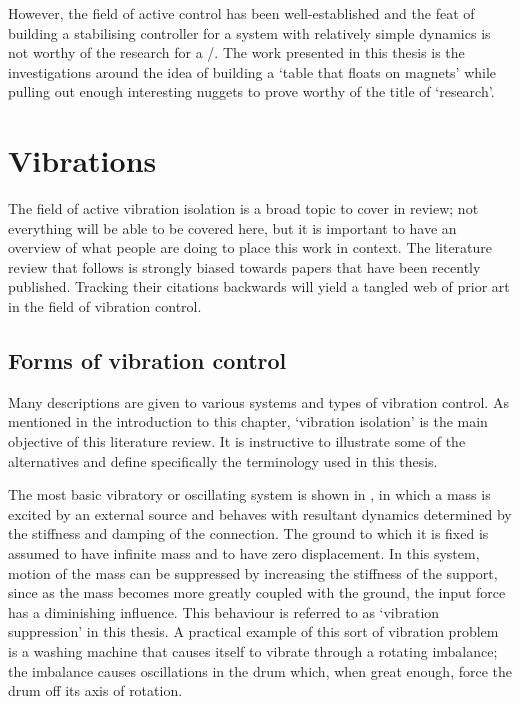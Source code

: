However, the field of active control has been well-established and the feat of building a stabilising controller for a system with relatively simple dynamics is not worthy of the research for a \PhD/.
The work presented in this thesis is the investigations around the idea of building a `table that floats on magnets' while pulling out enough interesting nuggets to prove worthy of the title of `research'.





\section{Vibrations}

The field of active vibration isolation is a broad topic to cover in review; not everything will be able to be covered here, but it is important to have an overview of what people are doing to place this work in context.
The literature review that follows is strongly biased towards papers that have been recently published.
Tracking their citations backwards will yield a tangled web of prior art in the field of vibration control.

\subsection{Forms of vibration control}

Many descriptions are given to various systems and types of vibration control.
As mentioned in the introduction to this chapter, `vibration isolation' is the main objective of this literature review.
It is instructive to illustrate some of the alternatives and define specifically the terminology used in this thesis.

The most basic vibratory or oscillating system is shown in , in which a mass is excited by an external source and behaves with resultant dynamics determined by the stiffness and damping of the connection.
The ground to which it is fixed is assumed to have infinite mass and to have zero displacement.
In this system, motion of the mass can be suppressed by increasing the stiffness of the support, since as the mass becomes more greatly coupled with the ground, the input force has a diminishing influence.
This behaviour is referred to as `vibration suppression' in this thesis.
A practical example of this sort of vibration problem is a washing machine that causes itself to vibrate through a rotating imbalance; the imbalance causes oscillations in the drum which, when great enough, force the drum off its axis of rotation.

